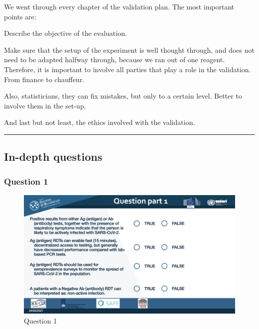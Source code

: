 \documentclass[
]{book}
\begin{document}
We went through every chapter of the validation plan. The most important
points are:

Describe the objective of the evaluation.

Make sure that the setup of the experiment is well thought through, and
does not need to be adapted halfway through, because we ran out of one
reagent. Therefore, it is important to involve all parties that play a
role in the validation. From finance to chauffeur.

Also, statisticians, they can fix mistakes, but only to a certain level.
Better to involve them in the set-up.

And last but not least, the ethics involved with the validation.

\begin{center}\rule{0.5\linewidth}{0.5pt}\end{center}

\hypertarget{in-depth-questions-1}{%
\subsection{In-depth questions}\label{in-depth-questions-1}}

\hypertarget{question-1-1}{%
\subsubsection{Question 1}\label{question-1-1}}

\begin{figure}
\centering
\includegraphics{images/m03/m03_questions_v2.001.jpeg}
\caption{Question 1}
\end{figure}
\end{document}
